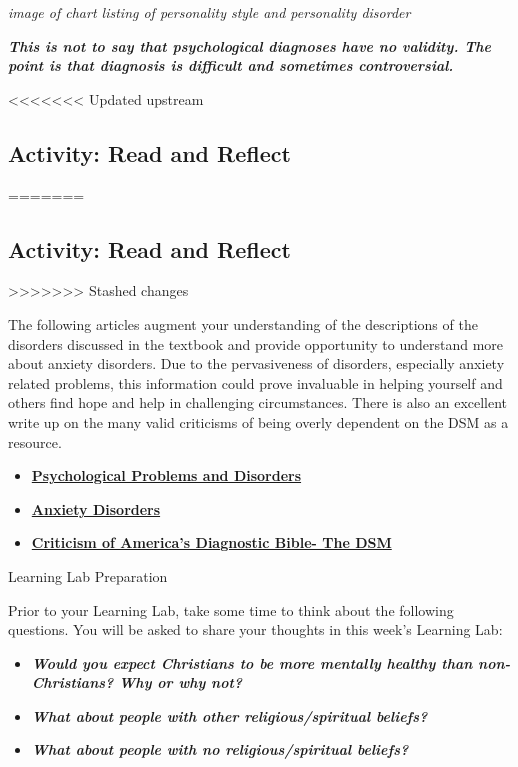 \documentclass[
]{book}
\providecommand{\tightlist}{%
  \setlength{\itemsep}{0pt}\setlength{\parskip}{0pt}}
\begin{document}
\emph{image of chart listing of personality style and personality disorder}

\textbf{\emph{This is not to say that psychological diagnoses have no validity. The point is that diagnosis is difficult and sometimes controversial.}}

<<<<<<< Updated upstream
\hypertarget{activity-read-and-reflect-15}{%
\subsection*{Activity: Read and Reflect}\label{activity-read-and-reflect-15}}
=======
\hypertarget{activity-read-and-reflect-14}{%
\subsection*{Activity: Read and Reflect}\label{activity-read-and-reflect-14}}
>>>>>>> Stashed changes

\begin{reflect}
The following articles augment your understanding of the descriptions of the disorders discussed in the textbook and provide opportunity to understand more about anxiety disorders. Due to the pervasiveness of disorders, especially anxiety related problems, this information could prove invaluable in helping yourself and others find hope and help in challenging circumstances. There is also an excellent write up on the many valid criticisms of being overly dependent on the DSM as a resource.

\begin{itemize}
\tightlist
\item
  \href{http://www.psychologyinfo.com/problems/}{\textbf{Psychological Problems and Disorders}}\\
\item
  \href{http://www.psychologyinfo.com/problems/anxiety.html}{\textbf{Anxiety Disorders}}\\
\item
  \href{http://www.oregoncounseling.org/Diagnosis/CriticismOfDSM.htm}{\textbf{Criticism of America's Diagnostic Bible- The DSM}}
\end{itemize}

{Learning Lab Preparation}

Prior to your Learning Lab, take some time to think about the following questions. You will be asked to share your thoughts in this week's Learning Lab:

\begin{itemize}
\tightlist
\item
  \textbf{\emph{Would you expect Christians to be more mentally healthy than non-Christians? Why or why not?}}\\
\item
  \textbf{\emph{What about people with other religious/spiritual beliefs?}}\\
\item
  \textbf{\emph{What about people with no religious/spiritual beliefs?}}
\end{itemize}
\end{reflect}
\end{document}
